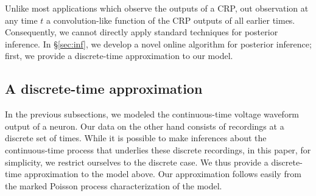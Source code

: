 Unlike most applications which observe the outputs of a CRP,  out observation at any time $t$ a convolution-like function of the CRP outputs of all
earlier times. Consequently, we cannot directly apply standard techniques for posterior inference. In \S \ref{sec:inf}, we develop a novel online 
algorithm for posterior inference; first, we provide a discrete-time approximation to our model.


\subsection{A discrete-time approximation}
In the previous subsections, we modeled the continuous-time voltage waveform output of a neuron. Our data on the other hand consists of recordings
at a discrete set of times. While it is possible to make inferences about the continuous-time process that underlies these discrete recordings,
in this paper, for simplicity, we restrict ourselves to the discrete case. We thus provide a discrete-time approximation to the model above. 
Our approximation follows easily from the marked Poisson process characterization of the model.

